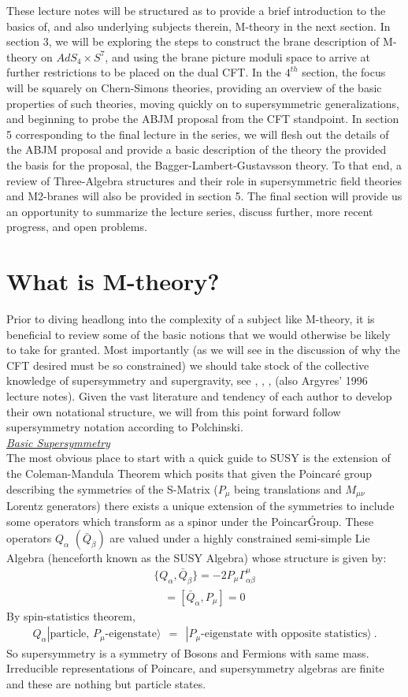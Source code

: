 \documentclass[12pt]{article}
\def\be{\begin{eqnarray}}\def\ba{\begin{eqnarray}}
\def\ee{\end{eqnarray}}\def\ea{\end{eqnarray}}
\begin{document}
These lecture notes will be structured as to provide a brief introduction to the basics of, and also underlying subjects therein, M-theory in the next section.  In section 3, we will be exploring the steps to construct the brane description of M-theory on $AdS_4 \times S^7$, and using the brane picture moduli space to arrive at further restrictions to be placed on the dual CFT.  In the $4^{th}$ section, the focus will be squarely on Chern-Simons theories, providing an overview of the basic properties of such theories,  moving quickly on to supersymmetric generalizations, and beginning to probe the ABJM proposal from the CFT standpoint.  In section 5 corresponding to the final lecture in the series, we will flesh out the details of the ABJM proposal and provide a basic description of the theory the provided the basis for the proposal, the Bagger-Lambert-Gustavsson theory.  To that end, a review of Three-Algebra structures and their role in supersymmetric field theories and M2-branes will also be provided in section 5.  The final section will provide us an opportunity to summarize the lecture series, discuss further, more recent progress, and open problems.

\section{What is M-theory?}
Prior to diving headlong into the complexity of a subject like M-theory, it is beneficial to review some of the basic notions that we would otherwise be likely to take for granted.  Most importantly (as we will see in the discussion of why the CFT desired must be so constrained) we should take stock of the collective knowledge of supersymmetry and supergravity, see \cite{Pol}, \cite{WB}, \cite{Lyk}, \cite{Sohn} (also Argyres' 1996 lecture notes).  Given the vast literature and tendency of each author to develop their own notational structure, we will from this point forward follow supersymmetry notation according to Polchinski.\\

\noindent\underline{\large \it{Basic Supersymmetry}}\\

The most obvious place to start with a quick guide to SUSY is the extension of the Coleman-Mandula Theorem which posits that given the Poincar\'{e} group describing the symmetries of the S-Matrix ($P_\mu$ being translations and $M_{\mu \nu}$ Lorentz generators) there exists a unique extension of the symmetries to include some operators which transform as a spinor under the Poincar\' Group.  These operators  $Q_\alpha \,\, (\bar{Q}_{\dot{\beta}})$  are valued under a highly constrained semi-simple Lie Algebra (henceforth known as the SUSY Algebra) whose structure is given by: 
\be
\{Q_\alpha, \bar{Q}_\beta\}=-2 P_\mu \Gamma^\mu_{\alpha \beta}
\ee
\be
[Q_\alpha, P_\mu] = [\bar{Q}_{\dot{\alpha}},P_\mu] =0
\ee
By spin-statistics theorem,  
\be
Q_\alpha |\text{particle, $P_\mu$-eigenstate}\rangle ~~=~~ |{\text{$P_\mu$-eigenstate with opposite statistics}}\rangle~.
\ee
 So supersymmetry is a symmetry of Bosons and Fermions with same mass. Irreducible representations of Poincare, and supersymmetry algebras are finite and these are 
nothing but particle states.
\end{document}
